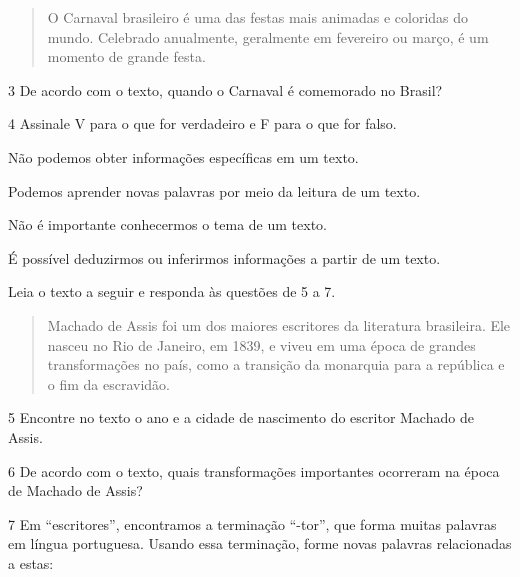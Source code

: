 \begin{quote}
O Carnaval brasileiro é uma das festas mais animadas e coloridas do
mundo. Celebrado anualmente, geralmente em fevereiro ou março, é um
momento de grande festa.
\end{quote}



\num{3} De acordo com o texto, quando o Carnaval é comemorado no Brasil?


\num{4} Assinale V para o que for verdadeiro e F para o que for falso.

\begin{boxlist}
 Não podemos obter informações específicas em um texto.

 Podemos aprender novas palavras por meio da leitura de um texto.

 Não é importante conhecermos o tema de um texto.

 É possível deduzirmos ou inferirmos informações a partir de um texto.
\end{boxlist}

Leia o texto a seguir e responda às questões de 5 a 7.

\begin{quote}
Machado de Assis foi um dos maiores escritores da literatura
brasileira. Ele nasceu no Rio de Janeiro, em 1839, e viveu em uma época
de grandes transformações no país, como a transição da monarquia para a
república e o fim da escravidão.
\end{quote}

\num{5} Encontre no texto o ano e a cidade de nascimento do escritor Machado de Assis.


\num{6} De acordo com o texto, quais transformações importantes ocorreram na época de Machado de Assis?


\num{7} Em “escritores”, encontramos a terminação “-tor”, que forma muitas palavras em língua portuguesa. Usando essa terminação, forme novas palavras relacionadas a estas:

